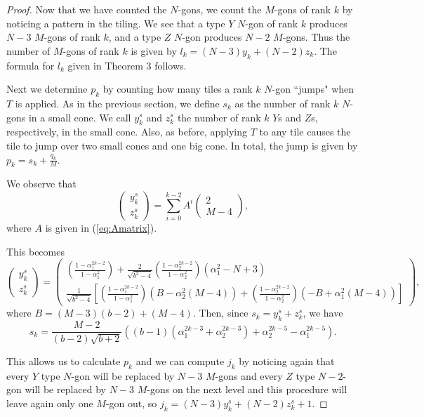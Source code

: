 \documentclass[11pt, oneside]{article}   	%
\begin{document}
\begin{proof}
Now that we have counted the $N$-gons, we count the $M$-gons of rank $k$ by noticing a pattern in the tiling. 
We see that a type $Y$ $N$-gon of rank $k$ produces $N-3$ $M$-gons of rank $k$, and a type $Z$ $N$-gon produces $N-2$ $M$-gons.
Thus the number of $M$-gons of rank $k$ is given by $l_k = (N-3)y_k + (N-2)z_k$. 
The formula for $l_k$ given in Theorem 3 follows.

Next we determine $p_k$ by counting how many tiles a rank $k$ $N$-gon ``jumps" when $T$ is applied. 
As in the previous section, we define $s_k$ as the number of rank $k$ $N$-gons in a small cone.
We call $y_k^s$ and $z_k^s$ the number of rank $k$ $Y$s and $Z$s, respectively, in the small cone.
Also, as before, applying $T$ to any tile causes the tile to jump over two small cones and one big cone. 
In total, the jump is given by $p_k = s_k + \frac{q_k}{M}$.

We observe that
\begin{equation}
\label{eq:conesum}
\begin{pmatrix}
y_k^s \\ z_k^s
\end{pmatrix}
=
\sum_{i=0}^{k-2} A^i 
\begin{pmatrix}
2 \\ M-4
\end{pmatrix},
\end{equation}
where $A$ is given in (\ref{eq:Amatrix}).

This becomes
$$
\begin{pmatrix}
y_k^s \\ z_k^s
\end{pmatrix}
=
\begin{pmatrix}
\left(\frac{1-\alpha_1^{2k-2}}{1-\alpha_1^2} \right) + 
	\frac{2}{\sqrt{b^2-4}}\left( \frac{1-\alpha_2^{2k-2}}{1-\alpha_2^2}\right)(\alpha_1^2-N+3)
\\ 
\frac{1}{\sqrt{b^2-4}}\left[
\left(\frac{1-\alpha_1^{2k-2}}{1-\alpha_1^2} \right)
(B-\alpha_2^2(M-4))
+ 
\left( \frac{1-\alpha_2^{2k-2}}{1-\alpha_2^2}\right)
(-B+\alpha_1^2(M-4))
\right]
\end{pmatrix},
$$
where
$B = (M-3)(b-2)+(M-4)$.
Then, since $s_k = y_k^s + z_k^s$, we have
$$s_k = \frac{M-2}{(b-2)\sqrt{b+2}}
\left(
(b-1)(\alpha_1^{2k-3} + \alpha_2^{2k-3})
+ \alpha_2^{2k-5} - \alpha_1^{2k-5}
\right)
.$$

This allows us to calculate $p_k$ and we can compute $j_k$ by noticing again that every $Y$ type $N$-gon will be replaced by $N-3$ $M$-gons and every $Z$ type $N-2$-gon will be replaced by $N-3$ $M$-gons on the next level and this procedure will leave again only one $M$-gon out, so $j_k=(N-3)y^s_k+(N-2)z^s_k+1$.
\end{proof}
\end{document}

